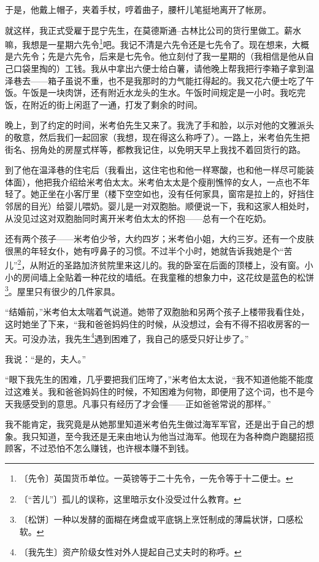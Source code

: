 \documentclass[12pt,UTF-8,openany]{ctexbook}
\begin{document}
\begin{large}
    于是，他戴上帽子，夹着手杖，哼着曲子，腰杆儿笔挺地离开了帐房。
    
    就这样，我正式受雇于昆宁先生，在莫德斯通–古林比公司的货行里做工。薪水嘛，我想是一星期六先令\footnote{〔先令〕英国货币单位。一英镑等于二十先令，一先令等于十二便士。}吧。我记不清是六先令还是七先令了。现在想来，大概是六先令；先是六先令，后来是七先令。他立刻付了我一星期的（我相信是他从自己口袋里掏的）工钱。我从中拿出六便士给白薯，请他晚上帮我把行李箱子拿到温泽巷去——箱子虽说不重，也不是我那时的力气能扛得起的。我又花六便士吃了午饭。午饭是一块肉饼，还有附近水龙头的生水。午饭时间规定是一小时。我吃完饭，在附近的街上闲逛了一通，打发了剩余的时间。
    
    晚上，到了约定的时间，米考伯先生又来了。我洗了手和脸，以示对他的文雅派头的敬意，然后我们一起回家（我想，现在得这么称呼了）。一路上，米考伯先生把街名、拐角处的房屋式样等，都教我记住，以免明天早上我找不着回货行的路。
    
    到了他在温泽巷的住宅后（我看出，这住宅也和他一样寒酸，也和他一样尽可能装体面），他把我介绍给米考伯太太。米考伯太太是个瘦削憔悴的女人，一点也不年轻了。她正坐在小客厅里（楼下空空如也，没有任何家具，窗帘是拉上的，好挡住邻居的目光）给婴儿喂奶。婴儿是一对双胞胎。顺便说一下，我和这家人相处时，从没见过这对双胞胎同时离开米考伯太太的怀抱——总有一个在吃奶。
    
    还有两个孩子——米考伯少爷，大约四岁；米考伯小姐，大约三岁。还有一个皮肤很黑的年轻女仆，她有哼鼻子的习惯。不过半个小时，她就告诉我她是个“苦儿”\footnote{〔“苦儿”〕孤儿的误称，这里暗示女仆没受过什么教育。}，从附近的圣路加济贫院里来这儿的。我的卧室在后面的顶楼上，没有窗。小小的房间墙上全贴着一种花纹的墙纸。在我童稚的想象力中，这花纹是蓝色的松饼\footnote{〔松饼〕一种以发酵的面糊在烤盘或平底锅上烹饪制成的薄扁状饼，口感松软。}。屋里只有很少的几件家具。
    
    “结婚前，”米考伯太太喘着气说道。她带了双胞胎和另两个孩子上楼带我看住处，这时她坐了下来，“我和爸爸妈妈住的时候，从没想过，会有不得不招收房客的一天。可没办法，我先生\footnote{〔我先生〕资产阶级女性对外人提起自己丈夫时的称呼。}遇到困难了，我自己的感受只好让步了。”
    
    我说：“是的，夫人。”
    
    “眼下我先生的困难，几乎要把我们压垮了，”米考伯太太说，“我不知道他能不能度过这难关。我和爸爸妈妈住的时候，不知困难为何物，即便用了这个词，也不是今天我感受到的意思。凡事只有经历了才会懂——正如爸爸常说的那样。”
    
    我不能肯定，我究竟是从她那里知道米考伯先生做过海军军官，还是出于自己的想象。我只知道，至今我还是无来由地认为他当过海军。他现在为各种商户跑腿招揽顾客，不过恐怕不怎么赚钱，也许根本赚不到钱。
    

\end{large}
\end{document}
